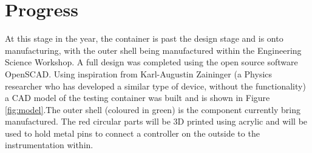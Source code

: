 \documentclass[a4paper,11pt]{article}
\begin{document}
\section{Progress}
At this stage in the year, the container is past the design stage and is onto manufacturing, with the outer shell being manufactured within the Engineering Science Workshop. A full design was completed using the open source software OpenSCAD. Using inspiration from Karl-Augustin Zaininger (a Physics researcher who has developed a similar type of device, without the functionality) a CAD model of the testing container was built and is shown in Figure \ref{fig:model}.The outer shell (coloured in green) is the component currently bring manufactured. The red circular parts will be 3D printed using acrylic and will be used to hold metal pins to connect a controller on the outside to the instrumentation within. 
\end{document}
